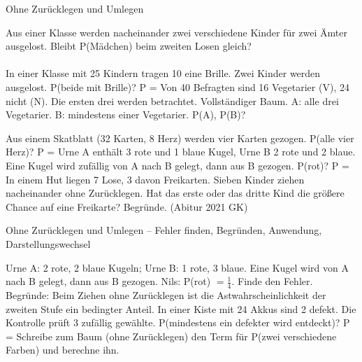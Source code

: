 \setcounter{aufgabe}{20}

\begin{aufgabe}{Ohne Zurücklegen und Umlegen}
\begin{teile}
\teil Aus einer Klasse werden nacheinander zwei verschiedene Kinder für zwei Ämter ausgelost. Bleibt P(Mädchen) beim zweiten Losen gleich?\\ \\ 
\teil In einer Klasse mit 25 Kindern tragen 10 eine Brille. Zwei Kinder werden ausgelost. P(beide mit Brille)? P = \leerfeld
\teil Von 40 Befragten sind 16 Vegetarier (V), 24 nicht (N). Die ersten drei werden betrachtet. Vollständiger Baum. A: alle drei Vegetarier. B: mindestens einer Vegetarier. P(A), P(B)?

\teil Aus einem Skatblatt (32 Karten, 8 Herz) werden vier Karten gezogen. P(alle vier Herz)? P = \leerfeld
\teil Urne A enthält 3 rote und 1 blaue Kugel, Urne B 2 rote und 2 blaue. Eine Kugel wird zufällig von A nach B gelegt, dann aus B gezogen. P(rot)? P = \leerfeld
\teil In einem Hut liegen 7 Lose, 3 davon Freikarten. Sieben Kinder ziehen nacheinander ohne Zurücklegen. Hat das erste oder das dritte Kind die größere Chance auf eine Freikarte? Begründe. \hfill (Abitur 2021 GK)
\end{teile}
\end{aufgabe}

\begin{aufgabe}{Ohne Zurücklegen und Umlegen – Fehler finden, Begründen, Anwendung, Darstellungswechsel}
\begin{teile}
\teil Urne A: 2 rote, 2 blaue Kugeln; Urne B: 1 rote, 3 blaue. Eine Kugel wird von A nach B gelegt, dann aus B gezogen. Nils: P(rot) $= \frac{1}{4}$. Finde den Fehler.
\teil Begründe: Beim Ziehen ohne Zurücklegen ist die Astwahrscheinlichkeit der zweiten Stufe ein bedingter Anteil.
\teil In einer Kiste mit 24 Akkus sind 2 defekt. Die Kontrolle prüft 3 zufällig gewählte. P(mindestens ein defekter wird entdeckt)? P = \leerfeld
\teil Schreibe zum Baum (ohne Zurücklegen) den Term für P(zwei verschiedene Farben) und berechne ihn.

\end{teile}
\end{aufgabe}
